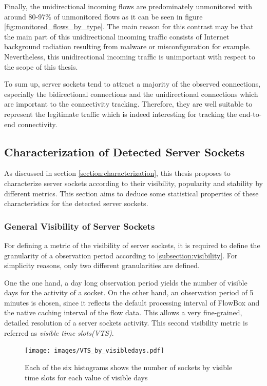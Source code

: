 Finally, the unidirectional incoming flows are predominately unmonitored with around 80-97\% of unmonitored flows as it can be seen in figure \ref{fig:monitored_flows_by_type}. 
The main reason for this contrast may be that the main part of this unidirectional incoming traffic consists of Internet background radiation \citep{Wustrow10,Pang04} resulting from malware or misconfiguration for example. 
Nevertheless, this unidirectional incoming traffic is unimportant with respect to the scope of this thesis.

To sum up, \glspl{server socket} tend to attract a majority of the observed connections, especially the bidirectional connections and the unidirectional connections which are important to the connectivity tracking. 
Therefore, they are well suitable to represent the legitimate traffic which is indeed interesting for tracking the end-to-end connectivity.

\newpage 
\subsection{Characterization of Detected Server Sockets}

As discussed in section \ref{section:characterization}, this thesis proposes to characterize \glspl{server socket} according to their visibility, popularity and stability by different metrics. This section aims to deduce some statistical properties of these characteristics for the detected \glspl{server socket}.

\subsubsection{General Visibility of Server Sockets}

For defining a metric of the visibility of \glspl{server socket}, it is required to define the granularity of a observation period according to \ref{subsection:visibility}. For simplicity reasons, only two different granularities are defined.

One the one hand, a day long observation period yields the number of visible days for the activity of a socket. 
On the other hand, an observation period of 5 minutes is chosen, since it reflects the default processing interval of FlowBox and the native caching interval of the flow data. 
This allows a very fine-grained, detailed resolution of a \glspl{server socket} activity. 
This second visibility metric is referred as \emph{visible time slots(VTS)}.
\begin{figure}
	[hb] \centering 
	\texttt{[image: images/VTS\_by\_visibledays.pdf]} \caption{Each of the six histograms shows the number of sockets by visible time slots for each value of visible days} 
	\label{fig:vts_by_visibledays} 
\end{figure}

